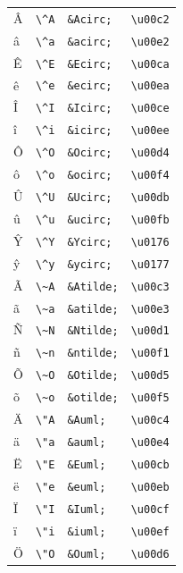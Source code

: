 \documentclass[oneside]{book}
\begin{document}
\begin{longtable}[]{@{}llll@{}}
Â & \texttt{\textbackslash{}\^{}A} & \texttt{\&Acirc;} &
\texttt{\textbackslash{}u00c2}\tabularnewline
â & \texttt{\textbackslash{}\^{}a} & \texttt{\&acirc;} &
\texttt{\textbackslash{}u00e2}\tabularnewline
Ê & \texttt{\textbackslash{}\^{}E} & \texttt{\&Ecirc;} &
\texttt{\textbackslash{}u00ca}\tabularnewline
ê & \texttt{\textbackslash{}\^{}e} & \texttt{\&ecirc;} &
\texttt{\textbackslash{}u00ea}\tabularnewline
Î & \texttt{\textbackslash{}\^{}I} & \texttt{\&Icirc;} &
\texttt{\textbackslash{}u00ce}\tabularnewline
î & \texttt{\textbackslash{}\^{}i} & \texttt{\&icirc;} &
\texttt{\textbackslash{}u00ee}\tabularnewline
Ô & \texttt{\textbackslash{}\^{}O} & \texttt{\&Ocirc;} &
\texttt{\textbackslash{}u00d4}\tabularnewline
ô & \texttt{\textbackslash{}\^{}o} & \texttt{\&ocirc;} &
\texttt{\textbackslash{}u00f4}\tabularnewline
Û & \texttt{\textbackslash{}\^{}U} & \texttt{\&Ucirc;} &
\texttt{\textbackslash{}u00db}\tabularnewline
û & \texttt{\textbackslash{}\^{}u} & \texttt{\&ucirc;} &
\texttt{\textbackslash{}u00fb}\tabularnewline
Ŷ & \texttt{\textbackslash{}\^{}Y} & \texttt{\&Ycirc;} &
\texttt{\textbackslash{}u0176}\tabularnewline
ŷ & \texttt{\textbackslash{}\^{}y} & \texttt{\&ycirc;} &
\texttt{\textbackslash{}u0177}\tabularnewline
Ã & \texttt{\textbackslash{}\textasciitilde{}A} & \texttt{\&Atilde;} &
\texttt{\textbackslash{}u00c3}\tabularnewline
ã & \texttt{\textbackslash{}\textasciitilde{}a} & \texttt{\&atilde;} &
\texttt{\textbackslash{}u00e3}\tabularnewline
Ñ & \texttt{\textbackslash{}\textasciitilde{}N} & \texttt{\&Ntilde;} &
\texttt{\textbackslash{}u00d1}\tabularnewline
ñ & \texttt{\textbackslash{}\textasciitilde{}n} & \texttt{\&ntilde;} &
\texttt{\textbackslash{}u00f1}\tabularnewline
Õ & \texttt{\textbackslash{}\textasciitilde{}O} & \texttt{\&Otilde;} &
\texttt{\textbackslash{}u00d5}\tabularnewline
õ & \texttt{\textbackslash{}\textasciitilde{}o} & \texttt{\&otilde;} &
\texttt{\textbackslash{}u00f5}\tabularnewline
Ä & \texttt{\textbackslash{}"A} & \texttt{\&Auml;} &
\texttt{\textbackslash{}u00c4}\tabularnewline
ä & \texttt{\textbackslash{}"a} & \texttt{\&auml;} &
\texttt{\textbackslash{}u00e4}\tabularnewline
Ë & \texttt{\textbackslash{}"E} & \texttt{\&Euml;} &
\texttt{\textbackslash{}u00cb}\tabularnewline
ë & \texttt{\textbackslash{}"e} & \texttt{\&euml;} &
\texttt{\textbackslash{}u00eb}\tabularnewline
Ï & \texttt{\textbackslash{}"I} & \texttt{\&Iuml;} &
\texttt{\textbackslash{}u00cf}\tabularnewline
ï & \texttt{\textbackslash{}"i} & \texttt{\&iuml;} &
\texttt{\textbackslash{}u00ef}\tabularnewline
Ö & \texttt{\textbackslash{}"O} & \texttt{\&Ouml;} &
\texttt{\textbackslash{}u00d6}\tabularnewline

\end{longtable}
\end{document}

